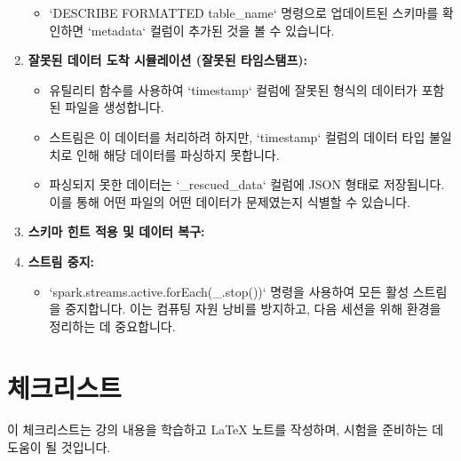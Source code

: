 \documentclass[11pt,a4paper]{article}
\begin{document}
\begin{examplebox}
\begin{enumerate}
\begin{itemize}
        \item `DESCRIBE FORMATTED table_name` 명령으로 업데이트된 스키마를 확인하면 `metadata` 컬럼이 추가된 것을 볼 수 있습니다.
    \end{itemize}
    \item \textbf{잘못된 데이터 도착 시뮬레이션 (잘못된 타임스탬프):}
    \begin{itemize}
        \item 유틸리티 함수를 사용하여 `timestamp` 컬럼에 잘못된 형식의 데이터가 포함된 파일을 생성합니다.
        \item 스트림은 이 데이터를 처리하려 하지만, `timestamp` 컬럼의 데이터 타입 불일치로 인해 해당 데이터를 파싱하지 못합니다.
        \item 파싱되지 못한 데이터는 `_rescued_data` 컬럼에 JSON 형태로 저장됩니다. 이를 통해 어떤 파일의 어떤 데이터가 문제였는지 식별할 수 있습니다.
    \end{itemize}
    \item \textbf{스키마 힌트 적용 및 데이터 복구:}
    \item \textbf{스트림 중지:}
    \begin{itemize}
        \item `spark.streams.active.forEach(_.stop())` 명령을 사용하여 모든 활성 스트림을 중지합니다. 이는 컴퓨팅 자원 낭비를 방지하고, 다음 세션을 위해 환경을 정리하는 데 중요합니다.
    \end{itemize}
\end{enumerate}
\end{examplebox}

\newpage
\section{체크리스트}
이 체크리스트는 강의 내용을 학습하고 LaTeX 노트를 작성하며, 시험을 준비하는 데 도움이 될 것입니다.
\end{document}
